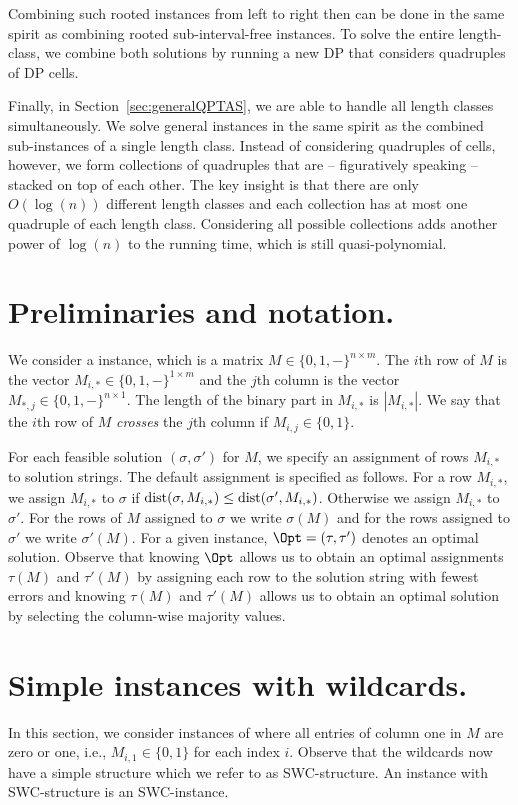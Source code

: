 Combining such rooted instances from left to right then can be done in the same spirit as combining rooted sub-interval-free instances.
To solve the entire length-class, we combine both solutions by running a new DP that considers quadruples of DP cells.

Finally, in Section~\ref{sec:generalQPTAS}, we are able to handle all length classes simultaneously. 
We solve general instances in the same spirit as the combined sub-instances of a single length class.
Instead of considering quadruples of cells, however, we form collections of quadruples that are -- figuratively speaking -- stacked on top of each other.
The key insight is that there are only $O(\log(n))$ different length classes and each collection has at most one quadruple of each length class.
Considering all possible collections adds another power of $\log(n)$ to the running time, which is still quasi-polynomial.

\section{Preliminaries and notation.}\label{sec:prelim}
We consider a \GMEC instance, which is a matrix $M \in \{0,1, -\}^{n \times m}$.
The $i$th row of $M$ is the vector $M_{i,*} \in \{0,1, -\}^{1 \times m}$ and the $j$th column is the vector $M_{*,j} \in \{0,1, -\}^{n \times 1}$.
The length of the binary part in $M_{i,*}$ is $|M_{i,*}|$. 
We say that the $i$th row of $M$ \emph{crosses} the $j$th column if $M_{i,j} \in \{0,1\}$.

For each feasible solution $(\sigma,\sigma')$ for $M$, we specify an assignment of rows $M_{i,*}$ to solution strings.
The default assignment is specified as follows.
For a row $M_{i,*}$, we assign $M_{i,*}$ to $\sigma$ if $\mathrm{dist}(\sigma,M_{i,*}) \le \mathrm{dist}(\sigma',M_{i,*})$.
Otherwise we assign $M_{i,*}$ to $\sigma'$.
For the rows of $M$ assigned to $\sigma$ we write $\sigma(M)$ and for the rows assigned to $\sigma'$ we write $\sigma'(M)$.
For a given instance, $\Opt = (\tau, \tau')$ denotes an optimal solution.
Observe that knowing $\Opt$ allows us to obtain an optimal assignments $\tau(M)$ and $\tau'(M)$ by assigning each row to the solution string with fewest errors and knowing $\tau(M)$ and $\tau'(M)$ allows us to obtain an optimal solution by selecting the column-wise majority values.

\section{Simple instances with wildcards.}\label{sec:swc}
In this section, we consider instances of \GMEC where all entries of column one in $M$ are zero or one, i.e., $M_{i,1} \in \{0,1\}$ for each index $i$.
Observe that the wildcards now have a simple structure which we refer to as SWC-structure.
An instance with SWC-structure is an SWC-instance.

